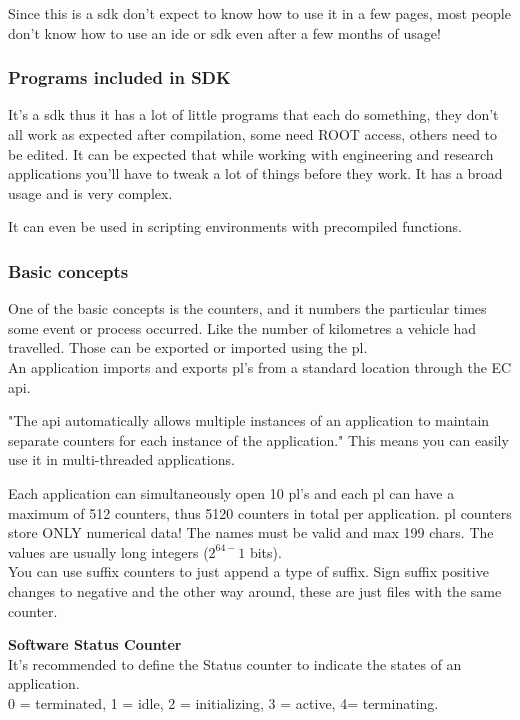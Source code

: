 Since this is a \gls{sdk} don't expect to know how to use it in a few pages, most people don't know how to use an \gls{ide} or \gls{sdk} even after a few months of usage!
\nolinebreak
\subsubsection{Programs included in SDK}
It's a \gls{sdk} thus it has a lot of little programs that each do something, they don't all work as expected after compilation, some need ROOT access, others need to be edited. It can be expected that while working with engineering and research applications you'll have to tweak a lot of things before they work. It has a broad usage and is very complex.

It can even be used in scripting environments with precompiled functions.
\subsubsection{Basic concepts}
One of the basic concepts is the counters, and it numbers the particular times some event or process occurred. Like the number of kilometres a vehicle had travelled. Those can be exported or imported using the \gls{pl}.\nolinebreak
{}
\\An application imports and exports \gls{pl}'s from a standard location through the EC \gls{api}.

"The \gls{api} automatically allows multiple instances of an application to maintain separate counters for each instance of the application." This means you can easily use it in multi-threaded applications.

Each application can simultaneously open 10 \gls{pl}'s and each \gls{pl} can have a maximum of 512 counters, thus 5120 counters in total per application. \gls{pl} counters store ONLY numerical data! The names must be valid and max 199 chars.  The values are usually long integers ($2^{64-}1$ bits).
\\You can use suffix counters to just append a type of suffix. Sign suffix positive changes to negative  and the other way around, these are just files with the same counter.

\textbf{Software Status Counter}
\\It's recommended to define the Status counter to indicate the states of an application. 
\\0 = terminated, 1 = idle, 2 = initializing, 3 = active, 4= terminating.

